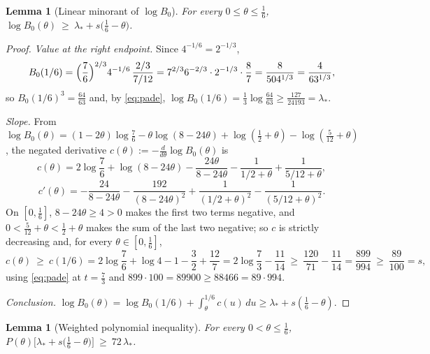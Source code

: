\documentclass[11pt]{amsart}
\newtheorem{lemma}[theorem]{Lemma}
\theoremstyle{remark}
\begin{document}
\begin{lemma}[Linear minorant of $\log B_0$]\label{lem:B0linear}
For every $0\le\theta\le\frac16$,
$\log B_0(\theta)\ \ge\ \lambda_*+s\bigl(\frac16-\theta\bigr)$.
\end{lemma}

\begin{proof}
\emph{Value at the right endpoint.}  Since $4^{-1/6}=2^{-1/3}$,
\[
        B_0(1/6)
        =\Bigl(\frac76\Bigr)^{2/3}4^{-1/6}\,\frac{2/3}{7/12}
        =7^{2/3}6^{-2/3}\cdot2^{-1/3}\cdot\frac{8}{7}
        =\frac{8}{504^{1/3}}
        =\frac{4}{63^{1/3}},
\]
so $B_0(1/6)^3=\tfrac{64}{63}$ and, by \eqref{eq:pade}, $\log B_0(1/6)=\frac13\log\frac{64}{63}\ge\frac{127}{24193}=\lambda_*$.

\emph{Slope.}  From $\log B_0(\theta)=(1-2\theta)\log\frac76-\theta\log(8-24\theta)+\log(\frac12+\theta)-\log(\frac5{12}+\theta)$, the negated derivative $c(\theta):=-\frac{d}{d\theta}\log B_0(\theta)$ is
\[
        c(\theta)
        =2\log\frac76+\log(8-24\theta)-\frac{24\theta}{8-24\theta}
        -\frac{1}{1/2+\theta}+\frac{1}{5/12+\theta},
\]
\[
        c'(\theta)
        =-\frac{24}{8-24\theta}-\frac{192}{(8-24\theta)^2}
        +\frac{1}{(1/2+\theta)^2}-\frac{1}{(5/12+\theta)^2}.
\]
On $[0,\tfrac16]$, $8-24\theta\ge4>0$ makes the first two terms negative, and $0<\frac5{12}+\theta<\frac12+\theta$ makes the sum of the last two negative; so $c$ is strictly decreasing and, for every $\theta\in[0,\tfrac16]$,
\[
        c(\theta)\ \ge\ c(1/6)
        =2\log\frac76+\log4-1-\frac32+\frac{12}7
        =2\log\frac73-\frac{11}{14}
        \ \ge\ \frac{120}{71}-\frac{11}{14}
        =\frac{899}{994}
        \ \ge\ \frac{89}{100}=s,
\]
using \eqref{eq:pade} at $t=\tfrac73$ and $899\cdot100=89900\ge88466=89\cdot994$.

\emph{Conclusion.}  $\log B_0(\theta)=\log B_0(1/6)+\int_\theta^{1/6}c(u)\,du\ge\lambda_*+s(\frac16-\theta)$.
\end{proof}

\begin{lemma}[Weighted polynomial inequality]\label{lem:cubic}
For every $0<\theta\le\frac16$,
$P(\theta)\bigl[\lambda_*+s\bigl(\frac16-\theta\bigr)\bigr]\ \ge\ 72\,\lambda_*$.
\end{lemma}
\end{document}
